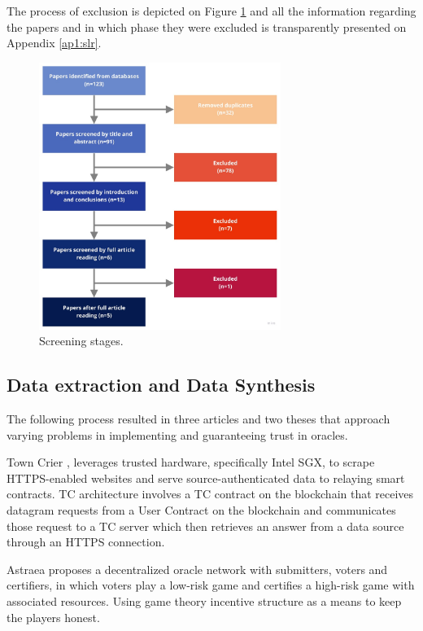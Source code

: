 The process of exclusion is depicted on Figure \ref{fig:/figures/paper-screening} and all the information regarding the papers and in which phase they were excluded is transparently presented on Appendix \ref{ap1:slr}.

\begin{figure}[t]
  \begin{center}
    \leavevmode
    \includegraphics[width=0.7\textwidth]{figures/paper-screening.jpg}
    \caption{Screening stages.}
    \label{fig:/figures/paper-screening}
  \end{center}
\end{figure}

\subsection{Data extraction and Data Synthesis}

The following process resulted in three articles and two theses that approach varying problems in implementing and guaranteeing trust in oracles.

Town Crier \cite{Zhang2016TownCrier}, leverages trusted hardware, specifically Intel SGX, to scrape HTTPS-enabled websites and serve source-authenticated data to relaying smart contracts. TC architecture involves a TC contract on the blockchain that receives datagram requests from a User Contract on the blockchain and communicates those request to a TC server which then retrieves an answer from a data source through an HTTPS connection.

Astraea \cite{Adler2018Astraea:Oracleb} proposes a decentralized oracle network with submitters, voters and certifiers, in which voters play a low-risk game and certifies a high-risk game with associated resources. Using game theory incentive structure as a means to keep the players honest.

